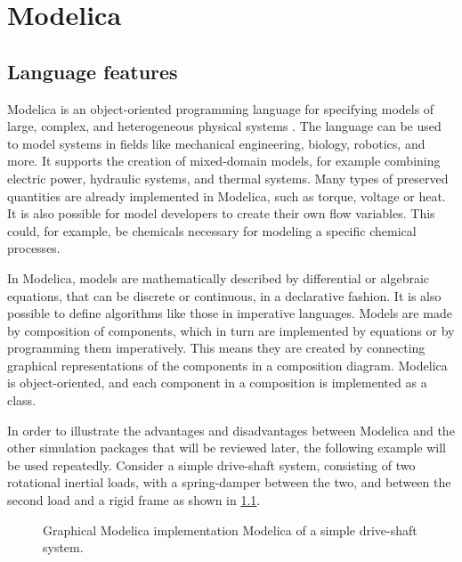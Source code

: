 \documentclass[\rootfolder/main.tex]{subfiles}
\begin{document}
\chapter{Modelica} %

\label{ch:modelica} %

\section{Language features}

Modelica is an object-oriented programming language for specifying models of large, complex, and heterogeneous physical systems \cite{clauss2002}.
The language can be used to model systems in fields like mechanical engineering, biology, robotics, and more.
It supports the creation of mixed-domain models, for example combining electric power, hydraulic systems, and thermal systems.
Many types of preserved quantities are already implemented in Modelica, such as torque, voltage or heat.
It is also possible for model developers to create their own flow variables.
This could, for example, be chemicals necessary for modeling a specific chemical processes.

In Modelica, models are mathematically described by differential or algebraic equations, that can be discrete or continuous, in a declarative fashion.
It is also possible to define algorithms like those in imperative languages.
Models are made by composition of components, which in turn are implemented by equations or by programming them imperatively.
This means they are created by connecting graphical representations of the components in a composition diagram.
Modelica is object-oriented, and each component in a composition is implemented as a class.

In order to illustrate the advantages and disadvantages between Modelica and the other simulation packages that will be reviewed later, the following example will be used repeatedly\footnotemark{}.
Consider a simple drive-shaft system, consisting of two rotational inertial loads, with a spring-damper between the two, and between the second load and a rigid frame as shown in \cref{fig:modelica-inertial}.


\begin{figure}[ht]
    \caption{Graphical Modelica implementation Modelica of a simple drive-shaft system.\label{fig:modelica-inertial}}
\end{figure}
\end{document}
